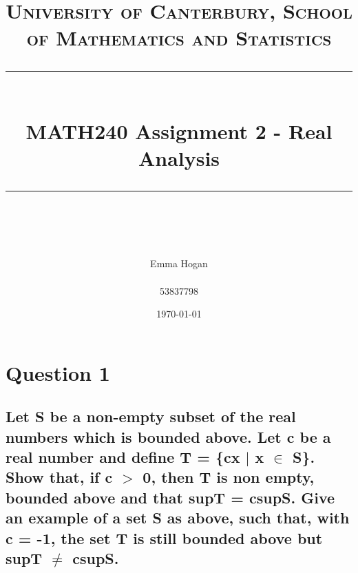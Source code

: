 \documentclass{article}
\title{	
	\normalfont\normalsize
	\textsc{University of Canterbury, School of Mathematics and Statistics}\\ %
	\vspace{25pt} %
	\rule{\linewidth}{0.5pt}\\ %
	\vspace{20pt} %
	{\huge MATH240 Assignment 2 - Real Analysis}\\ %
	\vspace{12pt} %
	\rule{\linewidth}{2pt}\\ %
	\vspace{12pt} %
}
\author{\LARGE Emma Hogan \\\\53837798} %
\date{\normalsize\today} %
\begin{document}
\begin{titlepage}
\maketitle
\end{titlepage}
\section*{Question 1}
\subsection*{Let S be a non-empty subset of the real numbers which is bounded above. Let c be a real number and define T = \{cx $\mid$ x $\in$ S\}. Show that, if c $>$ 0, then T is non empty, bounded above and that supT = csupS. Give an example of a set S as above, such that, with c = -1, the set T is still bounded above but supT $\ne$ csupS.}
\end{document}
